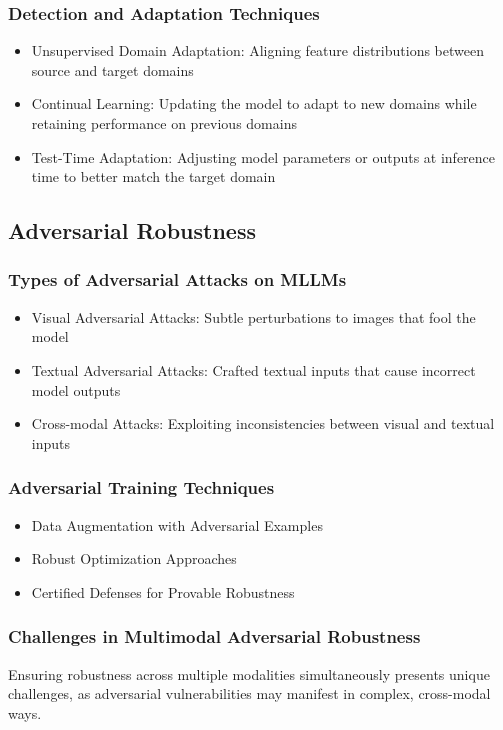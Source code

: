 \subsubsection{Detection and Adaptation Techniques}
\begin{itemize}
    \item Unsupervised Domain Adaptation: Aligning feature distributions between source and target domains
    \item Continual Learning: Updating the model to adapt to new domains while retaining performance on previous domains
    \item Test-Time Adaptation: Adjusting model parameters or outputs at inference time to better match the target domain
\end{itemize}

\subsection{Adversarial Robustness}
\subsubsection{Types of Adversarial Attacks on MLLMs}
\begin{itemize}
    \item Visual Adversarial Attacks: Subtle perturbations to images that fool the model
    \item Textual Adversarial Attacks: Crafted textual inputs that cause incorrect model outputs
    \item Cross-modal Attacks: Exploiting inconsistencies between visual and textual inputs
\end{itemize}

\subsubsection{Adversarial Training Techniques}
\begin{itemize}
    \item Data Augmentation with Adversarial Examples
    \item Robust Optimization Approaches
    \item Certified Defenses for Provable Robustness
\end{itemize}

\subsubsection{Challenges in Multimodal Adversarial Robustness}
Ensuring robustness across multiple modalities simultaneously presents unique challenges, as adversarial vulnerabilities may manifest in complex, cross-modal ways.

